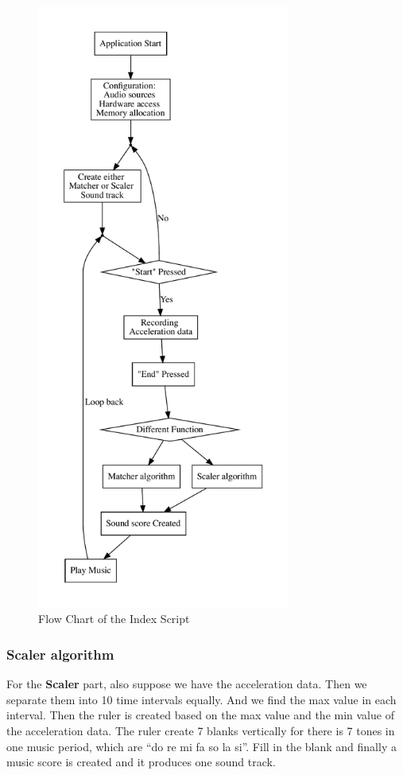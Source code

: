 \begin{figure}[H]
\centering
\includegraphics[height=20cm]{figWR/a}
\caption{Flow Chart of the Index Script}
\label{indexScript}
\end{figure}

\subsubsection{Scaler algorithm}

   For the \textbf{Scaler} part, also suppose we have the acceleration data.
   Then we separate them into 10 time intervals equally.
   And we find the max value in each interval.
   Then the ruler is created based on the max value and the min value of the
   acceleration data.
   The ruler create 7 blanks vertically for there is 7 tones in one music
   period, which are ``do re mi fa so la si''.
   Fill in the blank and finally a music score is created and it produces one
   sound track.

